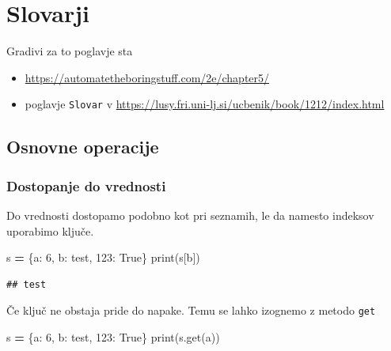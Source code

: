 \documentclass[
]{report}
\newenvironment{Shaded}{\begin{snugshade}}{\end{snugshade}}
\newcommand{\BuiltInTok}[1]{#1}
\newcommand{\DecValTok}[1]{\textcolor[rgb]{0.00,0.00,0.81}{#1}}
\newcommand{\NormalTok}[1]{#1}
\newcommand{\OperatorTok}[1]{\textcolor[rgb]{0.81,0.36,0.00}{\textbf{#1}}}
\newcommand{\StringTok}[1]{\textcolor[rgb]{0.31,0.60,0.02}{#1}}
\newcommand{\VariableTok}[1]{\textcolor[rgb]{0.00,0.00,0.00}{#1}}
\providecommand{\tightlist}{%
  \setlength{\itemsep}{0pt}\setlength{\parskip}{0pt}}
\begin{document}
\hypertarget{slovarji}{%
\chapter{Slovarji}\label{slovarji}}

Gradivi za to poglavje sta

\begin{itemize}
\tightlist
\item
  \url{https://automatetheboringstuff.com/2e/chapter5/}
\item
  poglavje \texttt{Slovar} v \url{https://lusy.fri.uni-lj.si/ucbenik/book/1212/index.html}
\end{itemize}

\hypertarget{osnovne-operacije}{%
\section{Osnovne operacije}\label{osnovne-operacije}}

\hypertarget{dostopanje-do-vrednosti}{%
\subsection{Dostopanje do vrednosti}\label{dostopanje-do-vrednosti}}

Do vrednosti dostopamo podobno kot pri seznamih, le da namesto indeksov uporabimo ključe.

\begin{Shaded}
\begin{Highlighting}[]
\NormalTok{s }\OperatorTok{=}\NormalTok{ \{}\StringTok{\textquotesingle{}a\textquotesingle{}}\NormalTok{: }\DecValTok{6}\NormalTok{, }\StringTok{\textquotesingle{}b\textquotesingle{}}\NormalTok{: }\StringTok{\textquotesingle{}test\textquotesingle{}}\NormalTok{, }\DecValTok{123}\NormalTok{: }\VariableTok{True}\NormalTok{\}}
\BuiltInTok{print}\NormalTok{(s[}\StringTok{\textquotesingle{}b\textquotesingle{}}\NormalTok{])}
\end{Highlighting}
\end{Shaded}

\begin{verbatim}
## test
\end{verbatim}

Če ključ ne obstaja pride do napake. Temu se lahko izognemo z metodo \texttt{get}

\begin{Shaded}
\begin{Highlighting}[]
\NormalTok{s }\OperatorTok{=}\NormalTok{ \{}\StringTok{\textquotesingle{}a\textquotesingle{}}\NormalTok{: }\DecValTok{6}\NormalTok{, }\StringTok{\textquotesingle{}b\textquotesingle{}}\NormalTok{: }\StringTok{\textquotesingle{}test\textquotesingle{}}\NormalTok{, }\DecValTok{123}\NormalTok{: }\VariableTok{True}\NormalTok{\}}
\BuiltInTok{print}\NormalTok{(s.get(}\StringTok{\textquotesingle{}a\textquotesingle{}}\NormalTok{))}
\end{Highlighting}
\end{Shaded}
\end{document}
